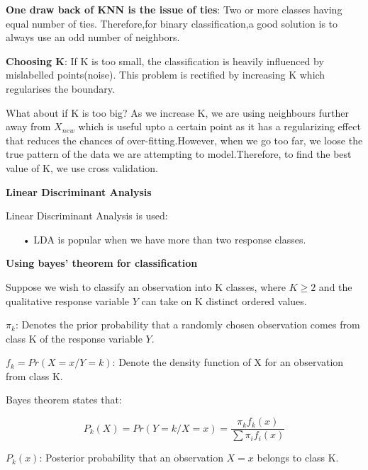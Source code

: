 \textbf{One draw back of KNN is the issue of ties}: Two or more classes having equal number of ties. Therefore,for binary classification,a good solution is to always use an odd number of neighbors.

\textbf{Choosing K}: If K is too small, the classification is heavily influenced by mislabelled points(noise). This problem is rectified by increasing K which regularises the boundary.

What about if K is too big? As we increase K, we are using neighbours further away from $X_{new}$ which is useful upto a certain point as it has a regularizing effect that reduces the chances of over-fitting.However, when we go too far, we loose the true pattern of the data we are attempting to model.Therefore, to find the best value of K, we use cross validation.

\begin{center}
\textbf{Linear Discriminant Analysis}
\end{center}

Linear Discriminant Analysis is used:
\begin{enumerate}

\item[•] LDA is popular when we have more than two response classes.
\end{enumerate}

\textbf{Using bayes' theorem for classification}

Suppose we wish to classify an observation into K classes, where $K\geqslant 2$ and the qualitative response variable $Y$ can take on K distinct ordered values.

$\pi_{k}$: Denotes the prior probability that a randomly chosen observation comes from  class K of the response variable $Y$.

$f_{k}=Pr(X=x/Y=k)$: Denote the density function of X for an observation from class K.

Bayes theorem states that:

\begin{equation}
P_{k}(X)=Pr(Y=k/X=x)=\dfrac{\pi_{k}f_{k}(x)}{\sum \pi_{i}f_{i}(x)} \label{1.3.3}
\end{equation} 

$P_{k}(x)$: Posterior probability that an observation $X=x$ belongs to class K.

